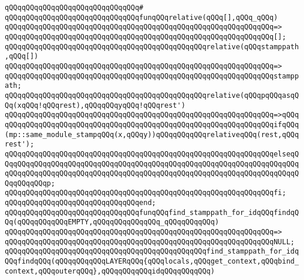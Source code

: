 \verb|qQQqqQQqqQQqqQQqqQQqqQQqqQQqqQQq#|\newline
\verb|qQQqqQQqqQQqqQQqqQQqqQQqqQQqqQQqfunqQQqrelative(qQQq[],qQQq_qQQq)|\newline
\verb|qQQqqQQqqQQqqQQqqQQqqQQqqQQqqQQqqQQqqQQqqQQqqQQqqQQqqQQqqQQqqQQq=>|\newline
\verb|qQQqqQQqqQQqqQQqqQQqqQQqqQQqqQQqqQQqqQQqqQQqqQQqqQQqqQQqqQQqqQQq[];|\newline
\newline
\verb|qQQqqQQqqQQqqQQqqQQqqQQqqQQqqQQqqQQqqQQqqQQqqQQqrelative(qQQqstamppath,qQQq[])|\newline
\verb|qQQqqQQqqQQqqQQqqQQqqQQqqQQqqQQqqQQqqQQqqQQqqQQqqQQqqQQqqQQqqQQq=>|\newline
\verb|qQQqqQQqqQQqqQQqqQQqqQQqqQQqqQQqqQQqqQQqqQQqqQQqqQQqqQQqqQQqqQQqstamppath;|\newline
\newline
\verb|qQQqqQQqqQQqqQQqqQQqqQQqqQQqqQQqqQQqqQQqqQQqqQQqrelative(qQQqpqQQqasqQQq(xqQQq!qQQqrest),qQQqqQQqyqQQq!qQQqrest')|\newline
\verb|qQQqqQQqqQQqqQQqqQQqqQQqqQQqqQQqqQQqqQQqqQQqqQQqqQQqqQQqqQQqqQQq=>qQQq|\newline
\verb|qQQqqQQqqQQqqQQqqQQqqQQqqQQqqQQqqQQqqQQqqQQqqQQqqQQqqQQqqQQqqQQqifqQQq(mp::same_module_stampqQQq(x,qQQqy))qQQqqQQqqQQqrelativeqQQq(rest,qQQqrest');|\newline
\verb|qQQqqQQqqQQqqQQqqQQqqQQqqQQqqQQqqQQqqQQqqQQqqQQqqQQqqQQqqQQqqQQqelseqQQqqQQqqQQqqQQqqQQqqQQqqQQqqQQqqQQqqQQqqQQqqQQqqQQqqQQqqQQqqQQqqQQqqQQqqQQqqQQqqQQqqQQqqQQqqQQqqQQqqQQqqQQqqQQqqQQqqQQqqQQqqQQqqQQqqQQqqQQqqQQqqQQqqQQqp;|\newline
\verb|qQQqqQQqqQQqqQQqqQQqqQQqqQQqqQQqqQQqqQQqqQQqqQQqqQQqqQQqqQQqqQQqfi;|\newline
\verb|qQQqqQQqqQQqqQQqqQQqqQQqqQQqqQQqend;|\newline
\newline
\verb|qQQqqQQqqQQqqQQqqQQqqQQqqQQqqQQqfunqQQqfind_stamppath_for_idqQQqfindqQQq(qQQqqQQqqQQqEMPTY,qQQqqQQqqQQqqQQq_qQQqqQQqqQQq)|\newline
\verb|qQQqqQQqqQQqqQQqqQQqqQQqqQQqqQQqqQQqqQQqqQQqqQQqqQQqqQQqqQQqqQQq=>|\newline
\verb|qQQqqQQqqQQqqQQqqQQqqQQqqQQqqQQqqQQqqQQqqQQqqQQqqQQqqQQqqQQqqQQqNULL;|\newline
\newline
\verb|qQQqqQQqqQQqqQQqqQQqqQQqqQQqqQQqqQQqqQQqqQQqqQQqfind_stamppath_for_idqQQqfindqQQq(qQQqqQQqqQQqLAYERqQQq{qQQqlocals,qQQqget_context,qQQqbind_context,qQQqouterqQQq},qQQqqQQqqQQqidqQQqqQQqqQQq)|\newline

